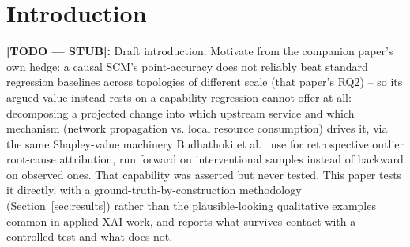 \documentclass[journal, 10pt]{IEEEtran}
\begin{document}
\section{Introduction}
\label{sec:introduction}
\textbf{[TODO --- STUB]:} Draft introduction. Motivate from the companion paper's own hedge:
a causal SCM's point-accuracy does not reliably beat standard regression
baselines across topologies of different scale (that paper's RQ2) -- so its
argued value instead rests on a capability regression cannot offer at all:
decomposing a projected change into which upstream service and which
mechanism (network propagation vs. local resource consumption) drives it,
via the same Shapley-value machinery Budhathoki et al.\ \cite{budhathoki2022rootcause}
use for retrospective outlier root-cause attribution, run forward on
interventional samples instead of backward on observed ones. That capability
was asserted but never tested. This paper tests it directly, with a
ground-truth-by-construction methodology (Section~\ref{sec:results}) rather
than the plausible-looking qualitative examples common in applied XAI work,
and reports what survives contact with a controlled test and what does not.
\end{document}
